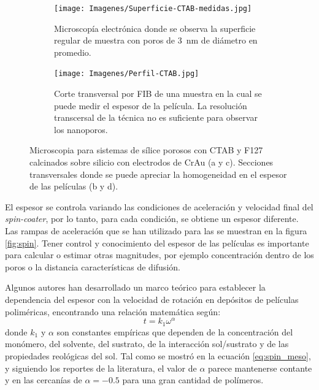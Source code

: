 \begin{figure}[bh!]
\begin{subfigure}[t]{0.495\textwidth}
			       		\label{fig:sem_homogeneidad2}
			       		\end{subfigure}
			       	\begin{subfigure}[t]{0.495\textwidth}
			        	\texttt{[image: Imagenes/Superficie-CTAB-medidas.jpg]}
			       		\caption{Microscopía electrónica donde se observa la superficie regular de muestra \pdmC\space con poros de \SI{3}{nm} de diámetro en promedio.}
			       		\label{fig:sem_homogeneidad3}
			       		\end{subfigure}
					\begin{subfigure}[t]{0.49\textwidth}
			 	   	    \texttt{[image: Imagenes/Perfil-CTAB.jpg]}
			       		\caption{Corte transversal por FIB de una muestra \pdmC\space en la cual se puede medir el espesor de la película. La resolución transcersal de la técnica no es suficiente para observar los nanoporos.}
			       		\label{fig:sem_homogeneidad4}
			       		\end{subfigure}	
					
					\vspace{-2mm}
					 \caption[MEB \pdmC\space y \pdmF.]{Microscopia para sistemas de sílice porosos con CTAB y F127 calcinados sobre silicio con electrodos de Cr\textbar Au (a y c). Secciones transversales donde se puede apreciar la homogeneidad en el espesor de las películas (b y d).}
					 \label{fig:sem_homogeneidad}	
				     \vspace*{0.2cm}
				     \end{figure}
 	
		 El espesor se controla variando las condiciones de aceleración y velocidad final del \textit{spin-coater}, por lo tanto, para cada condición, se obtiene un espesor diferente. Las rampas de aceleración que se han utilizado para las \pdm\space se muestran en la figura \ref{fig:spin}. Tener control y conocimiento del espesor de las películas es importante para calcular o estimar otras magnitudes, por ejemplo concentración dentro de los poros o la distancia características de difusión. 

		 Algunos autores han desarrollado un marco teórico para establecer la dependencia del espesor con la velocidad de rotación en depósitos de películas poliméricas, encontrando una relación matemática según: \cite{Norrman2005,Meyerhofer1978,Bornside1989,Lora1990}
			\begin{equation}
			  t = k_1 \omega^{\alpha}
			  \label{eq:spin_meso}
			  \end{equation}		
		donde $k_1$ y $\alpha$ son constantes empíricas que dependen de la concentración del monómero, del solvente, del sustrato, de la interacción sol/sustrato y  de las propiedades reológicas del sol. Tal como se mostró en la ecuación \ref{eq:spin_meso}, y siguiendo los reportes de la literatura, el valor de $\alpha$ parece mantenerse contante y en las cercanías de $\alpha=-0.5$ para una gran cantidad de polímeros. 

